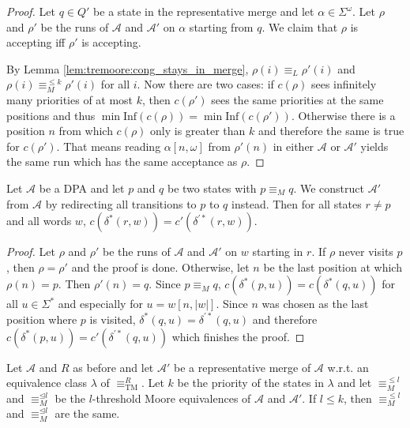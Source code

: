\begin{proof}
	Let $q \in Q'$ be a state in the representative merge and let $\alpha \in \Sigma^\omega$. Let $\rho$ and $\rho'$ be the runs of $\mathcal{A}$ and $\mathcal{A}'$ on $\alpha$ starting from $q$. We claim that $\rho$ is accepting iff $\rho'$ is accepting.
	
	By Lemma \ref{lem:tremoore:cong_stays_in_merge}, $\rho(i) \equiv_L \rho'(i)$ and $\rho(i) \equiv_M^{\leq k} \rho'(i)$ for all $i$. Now there are two cases: if $c(\rho)$ sees infinitely many priorities of at most $k$, then $c(\rho')$ sees the same priorities at the same positions and thus $\min \text{Inf}(c(\rho)) = \min \text{Inf}(c(\rho'))$. Otherwise there is a position $n$ from which $c(\rho)$ only is greater than $k$ and therefore the same is true for $c(\rho')$. That means reading $\alpha[n,\omega]$ from $\rho'(n)$ in either $\mathcal{A}$ or $\mathcal{A}'$ yields the same run which has the same acceptance as $\rho$.
\end{proof}

\begin{lem}
	Let $\mathcal{A}$ be a DPA and let $p$ and $q$ be two states with $p \equiv_M q$. We construct $\mathcal{A}'$ from $\mathcal{A}$ by redirecting all transitions to $p$ to $q$ instead. Then for all states $r \neq p$ and all words $w$, $c(\delta^*(r, w)) = c'(\delta^{\prime *}(r, w))$.
	\label{lem:tremoore:moore_redirect_is_ok}
\end{lem} %

\begin{proof}
	Let $\rho$ and $\rho'$ be the runs of $\mathcal{A}$ and $\mathcal{A}'$ on $w$ starting in $r$. If $\rho$ never visits $p$, then $\rho = \rho'$ and the proof is done. Otherwise, let $n$ be the last position at which $\rho(n) = p$. Then $\rho'(n) = q$. Since $p \equiv_M q$, $c(\delta^*(p, u)) = c(\delta^*(q, u))$ for all $u \in \Sigma^*$ and especially for $u = w[n, |w|]$. Since $n$ was chosen as the last position where $p$ is visited, $\delta^*(q, u) = \delta^{\prime *}(q, u)$ and therefore $c(\delta^*(p, u)) = c'(\delta^{\prime *}(q, u))$ which finishes the proof.
\end{proof}

\begin{lem}
	Let $\mathcal{A}$ and $R$ as before and let $\mathcal{A}'$ be a representative merge of $\mathcal{A}$ w.r.t. an equivalence class $\lambda$ of $\equiv_\text{TM}^R$. Let $k$ be the priority of the states in $\lambda$ and let $\equiv_M^{\leq l}$ and $\equiv_M^{\unlhd l}$ be the $l$-threshold Moore equivalences of $\mathcal{A}$ and $\mathcal{A}'$. If $l \leq k$, then $\equiv_M^{\leq l}$ and $\equiv_M^{\unlhd l}$ are the same.
\end{lem} %

